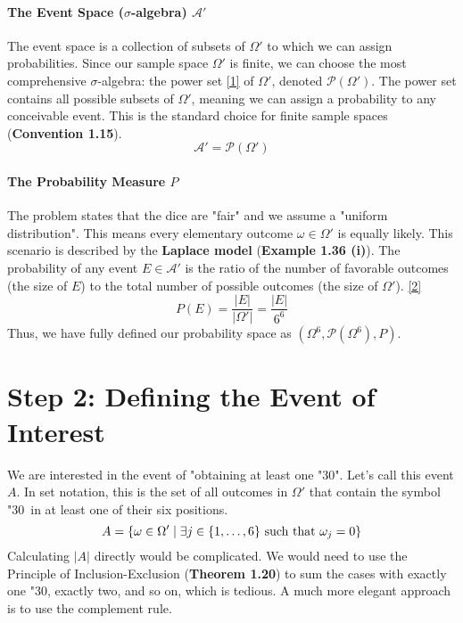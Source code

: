 \documentclass[11pt,a4paper]{article}
\providecommand{\dicei}{\wasyfamily\char"30}
\begin{document}
\paragraph{The Event Space (\texorpdfstring{$\sigma$}{sigma}-algebra) $\mathcal{A}'$}
The event space is a collection of subsets of $\Omega'$ to which we can assign probabilities. Since our sample space $\Omega'$ is finite, we can choose the most comprehensive $\sigma$-algebra: the power set \hyperlink{note:powerset}{[1]} of $\Omega'$, denoted $\mathcal{P}(\Omega')$. The power set contains all possible subsets of $\Omega'$, meaning we can assign a probability to any conceivable event. This is the standard choice for finite sample spaces (\textbf{Convention 1.15}).
\[
\mathcal{A}' = \mathcal{P}(\Omega')
\]

\paragraph{The Probability Measure $P$}
The problem states that the dice are "fair" and we assume a "uniform distribution". This means every elementary outcome $\omega \in \Omega'$ is equally likely. This scenario is described by the \textbf{Laplace model} (\textbf{Example 1.36 (i)}). The probability of any event $E \in \mathcal{A}'$ is the ratio of the number of favorable outcomes (the size of $E$) to the total number of possible outcomes (the size of $\Omega'$). \hyperlink{note:laplace}{[2]}
\[
P(E) = \frac{|E|}{|\Omega'|} = \frac{|E|}{6^6}
\]
Thus, we have fully defined our probability space as $(\Omega^6, \mathcal{P}(\Omega^6), P)$.

\section{Step 2: Defining the Event of Interest}

We are interested in the event of "obtaining at least one \dicei". Let's call this event $A$. In set notation, this is the set of all outcomes in $\Omega'$ that contain the symbol \dicei\ in at least one of their six positions.
\[
A = \{ \omega \in \Omega' \mid \exists j \in \{1, \dots, 6\} \text{ such that } \omega_j = \dicei \}
\]
Calculating $|A|$ directly would be complicated. We would need to use the Principle of Inclusion-Exclusion (\textbf{Theorem 1.20}) to sum the cases with exactly one \dicei, exactly two, and so on, which is tedious. A much more elegant approach is to use the complement rule.
\end{document}
